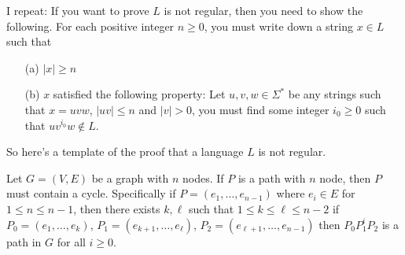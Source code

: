 I repeat: If you want to prove $L$ is not regular, then you need to
show the following. For each positive integer $n \geq 0$, you must
write down a string $x \in L$ such that
 \begin{enumerate}[label=\textnormal{(\alph*)},itemsep=0pt,nosep,noitemsep,partopsep=0pt,topsep=0pt,parsep=0pt]
  \item[(a)] $|x| \geq n$
  \item[(b)]$x$ satisfied the following property: Let $u,v,w \in
  \Sigma^*$ be any strings such that $x = uvw$, $|uv| \leq n$ and
  $|v| > 0$, you must find some integer $i_0 \geq 0$ such that
  $uv^{i_0}w \notin L$.
 \end{enumerate}

So here's a template of the proof that a language $L$ is not
regular.



\begin{lem}
 Let $G = (V,E)$ be a graph with $n$ nodes.
 If $P$ is a path with $n$ node, then $P$ must contain a cycle.
 Specifically if $P = (e_1,\ldots,e_{n-1})$ where $e_i \in E$ for
 $1 \leq n \leq n-1$,
 then there exists $k,\ell$ such that $1\leq k \leq \ell \leq n-2$
 if $P_0 = (e_1,\ldots,e_k)$,
 $P_1 = (e_{k+1},\ldots,e_\ell)$,
 $P_2 = (e_{\ell+1},\ldots,e_{n-1})$
 then $P_0P_1^iP_2$ is a path in $G$ for all $i \geq 0$.
\end{lem}

